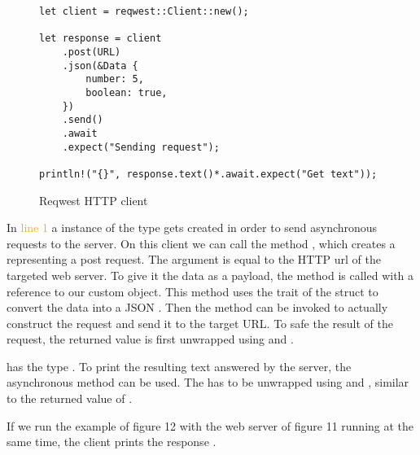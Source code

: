 \begin{figure}[ht]
    \begin{verbatim}
let client = reqwest::Client::new();

let response = client
    .post(URL)
    .json(&Data {
        number: 5,
        boolean: true,
    })
    .send()
    .await
    .expect("Sending request");

println!("{}", response.text()*.await.expect("Get text"));
    \end{verbatim}
    \caption{Reqwest HTTP client}
\end{figure}

In \textcolor{orange}{line 1} a instance of the type  gets created in order to send asynchronous
requests to the server. On this client we can call the method , which creates a
 representing a post request. The argument  is equal to the HTTP url of the
targeted web server. To give it the data as a payload, the method  is called with a reference to our custom
 object. This method uses the  trait of the struct to convert the data into a JSON
. Then the  method can be invoked to actually construct the request and send it to the target
URL. To safe the result of the request, the returned value is first unwrapped using  and .

 has the type . To print the resulting text answered by the server, the
asynchronous method  can be used. The  has to be unwrapped using  and
, similar to the returned value of .

If we run the example of figure 12 with the web server of figure 11 running at the same time, the client prints the
response  .
